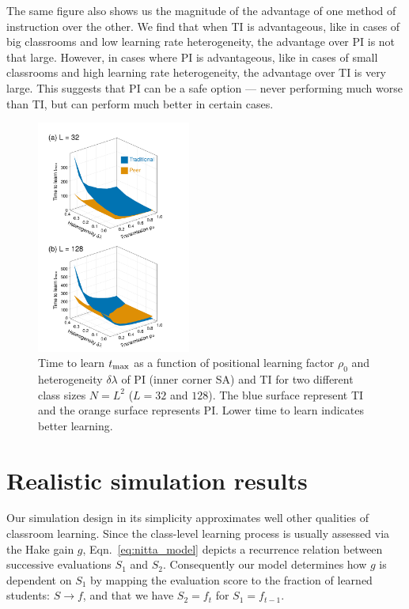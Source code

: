 \documentclass[twocolumn,secnumarabic,amssymb, nobibnotes, aps, prd]{revtex4-2}
\begin{document}
        The same figure also shows us the magnitude of the advantage of one method of instruction over the other.
        We find that when TI is advantageous, like in cases of big classrooms and low learning rate heterogeneity, the advantage over PI is not that large.
        However, in cases where PI is advantageous, like in cases of small classrooms and high learning rate heterogeneity, the advantage over TI is very large.
        This suggests that PI can be a safe option --- never performing much worse than TI, but can perform much better in certain cases.

        \begin{figure}[htbp!]
            \centering
            \includegraphics[width=0.45\textwidth]{figures/figure5.png}
            \caption{Time to learn $t_{\rm max}$ as a function of positional learning factor $\rho_0$ and heterogeneity $\delta\lambda$ of PI (inner corner SA) and TI for two different class sizes $N=L^2$ ($L=32$ and $128$).
            The blue surface represent TI and the orange surface represents PI.
            Lower time to learn indicates better learning.}
            \label{fig:Params effect summary t}
        \end{figure}

\section{Realistic simulation results}

    Our simulation design in its simplicity approximates well other qualities of classroom learning.
    Since the class-level learning process is usually assessed via the Hake gain $g$, Eqn.~\ref{eq:nitta_model} depicts a recurrence relation between successive evaluations $S_1$ and $S_2$.
    Consequently our model determines how $g$ is dependent on $S_1$ by mapping the evaluation score to the fraction of learned students: ${S}\rightarrow{f}$, and that we have $S_2=f_{t}$ for $S_1=f_{t-1}$.
\end{document}
